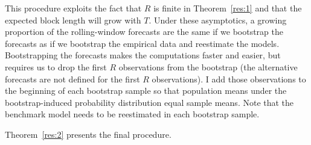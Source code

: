 \documentclass[10pt,fleqn,draft]{article}
\theoremstyle{definition}
\begin{document}
This procedure exploits the fact that $R$ is finite in
Theorem~\ref{res:1} and that the expected block length will grow with
$T$.  Under these asymptotics, a growing proportion of the
rolling-window forecasts are the same if we bootstrap the forecasts as
if we bootstrap the empirical data and reestimate the models.
Bootstrapping the forecasts makes the computations faster and easier,
but requires us to drop the first $R$ observations from the bootstrap
(the alternative forecasts are not defined for the first $R$
observations).  I add those observations to the beginning of each
bootstrap sample so that population means under the bootstrap-induced
probability distribution equal sample means.  Note that the benchmark
model needs to be reestimated in each bootstrap sample.

Theorem~\ref{res:2} presents the final procedure.
\end{document}
